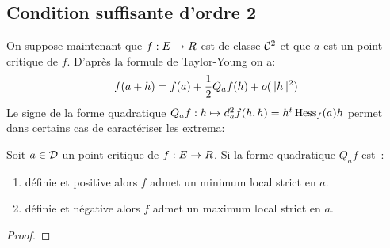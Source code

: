 \sld{\vfill\pagebreak[5]}%
\subsection{Condition suffisante d'ordre 2}

On suppose maintenant que $f:E \to R$ est de classe $\mathcal{C}^2$ et que $a$ est un point critique de $f$. D'après la formule de Taylor-Young on a:
\[
	f(a+h) = f(a) + \frac{1}{2} Q_a f(h) + o(\lVert h\rVert^2)
\]
Le signe de la forme quadratique $Q_a f:h \mapsto d_a^2f(h,h) = h^t \operatorname{Hess}_f (a) h$  permet dans certains cas de caractériser les extrema:

\begin{proposition}
	Soit $a \in \mathcal{D}$ un point critique de $f:E \to R$. Si la forme quadratique $Q_a f $ est~:
	\begin{enumerate}
		\item définie et positive alors $f$ admet un minimum local strict en $a$. 
		\item définie et négative alors $f$ admet un maximum local strict en $a$. 
	\end{enumerate}
\end{proposition}

\begin{proof}
	\pl{\rep{7cm}}	
\end{proof}


